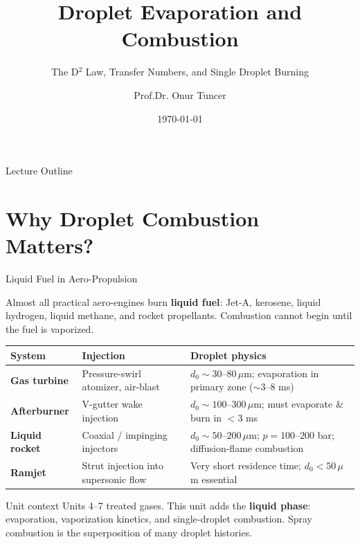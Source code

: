 \documentclass[12pt,aspectratio=169]{beamer}
\title{Droplet Evaporation and Combustion}
\subtitle{The D$^2$ Law, Transfer Numbers, and Single Droplet Burning}
\author{Prof.Dr. Onur Tuncer}
\institute{ITU Dept. of Aeronautical Eng.}
\date{\today}
\begin{document}
\begin{frame}
  \titlepage
\end{frame}

\begin{frame}{Lecture Outline}
  \tableofcontents
\end{frame}

\section{Why Droplet Combustion Matters?}

\begin{frame}{Liquid Fuel in Aero-Propulsion}

  Almost all practical aero-engines burn \textbf{liquid fuel}:
  Jet-A, kerosene, liquid hydrogen, liquid methane, and rocket
  propellants.
  Combustion cannot begin until the fuel is vaporized.

  \begin{center}
  \renewcommand{\arraystretch}{1.35}
  \begin{tabular}{>{\bfseries}p{2.8cm} p{4.3cm} p{4.5cm}}
    \toprule
    System & Injection & Droplet physics \\
    \midrule
    Gas turbine & Pressure-swirl atomizer, air-blast
      & $d_0 \sim 30$--$80\,\mu$m; evaporation in
        primary zone ($\sim$3--8 ms) \\
    Afterburner & V-gutter wake injection
      & $d_0 \sim 100$--$300\,\mu$m; must evaporate
        \& burn in $< 3$ ms \\
    Liquid rocket & Coaxial / impinging injectors
      & $d_0 \sim 50$--$200\,\mu$m; $p = 100$--$200$ bar;
        diffusion-flame combustion \\
    Ramjet & Strut injection into supersonic flow
      & Very short residence time; $d_0 < 50\,\mu$m essential \\
    \bottomrule
  \end{tabular}
  \end{center}

  \begin{exampleblock}{Unit context}
    Units 4--7 treated gases.
    This unit adds the \textbf{liquid phase}: evaporation,
    vaporization kinetics, and single-droplet combustion.
    Spray combustion is the superposition of many droplet histories.
  \end{exampleblock}
\end{frame}
\end{document}
